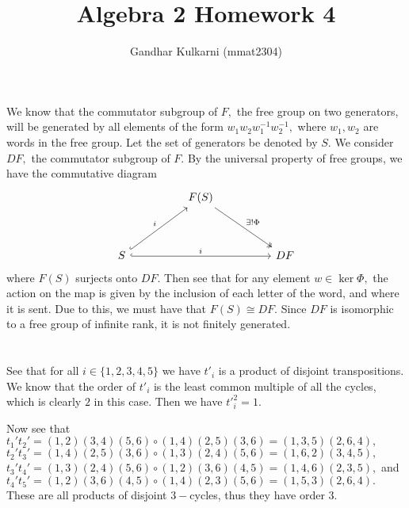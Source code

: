 \documentclass{article}
\title{Algebra 2 Homework 4} %
\author{Gandhar Kulkarni (mmat2304)} %
\date{} %
\begin{document}
 
\maketitle %


\section{} %
We know that the commutator subgroup of $F,$ the free group on two generators, will be generated by all elements of the form $w_1w_2w_1^{-1}w_2^{-1},$ where 
$w_1,w_2$ are words in the free group. Let the set of generators be denoted by $S.$ We consider $DF,$ the commutator subgroup of $F.$ By the universal 
property of free groups, we have the commutative diagram 
% 
\[\begin{tikzcd}
	&& {F(S)} \\
	\\
	S &&&& DF
	\arrow["i", hook, from=3-1, to=3-5]
	\arrow["i", hook, from=3-1, to=1-3]
	\arrow["{\exists ! \Phi}", two heads, from=1-3, to=3-5]
\end{tikzcd}\]
where $F(S)$ surjects onto $DF.$ Then see that for any element $w \in \ker \Phi,$ the action on the map is given by the inclusion of each letter of the 
word, and where it is sent. Due to this, we must have that $F(S) \cong DF.$ Since $DF$ is isomorphic to a free group of infinite rank, it is not finitely 
generated. 
\section{} %
See that for all $i \in \{1,2,3,4,5\}$ we have $t'_i$ is a product of disjoint transpositions. We know that the order of $t'_i$ is the least common multiple 
of all the cycles, which is clearly $2$ in this case. Then we have ${t'}_i^2=1.$

Now see that $t_1't_2'= (1 ,2)(3 ,4)(5 ,6)\circ (1 ,4)(2, 5)(3, 6)=(1 ,3 ,5)(2, 6 ,4),$ $t_2't_3'=(1 ,4)(2, 5)(3, 6) \circ (1, 3)(2, 4)(5, 6)=(1, 6 ,2)(3, 
4, 5),$
$t_3't_4'= (1, 3)(2 ,4)(5 ,6) \circ (1, 2) (3, 6) (4, 5)=(1 ,4 ,6)(2, 3 ,5),$ and $t_4' t_5'= (1, 2) (3, 6) (4, 5) \circ (1, 4)(2, 3)(5, 6)=(1 ,5, 3)(2, 6, 
4).$ These are all 
products of disjoint $3-$cycles, thus they have order $3.$ 
\end{document}
